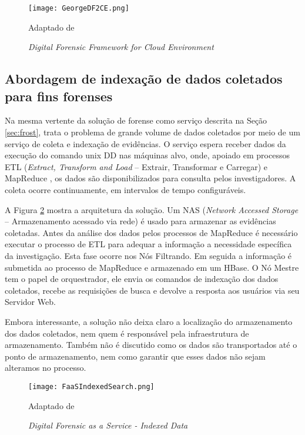 \begin{figure}[htb!]
\footnotesize
\caption{\textit{Digital Forensic Framework for Cloud Environment}}
\texttt{[image: GeorgeDF2CE.png]}
\centering
\label{fig:GeorgeDF2CE}
\begin{center}
Adaptado de \cite{GeorgeDF2CE:2012} 
\end{center}
\end{figure}


\subsection{Abordagem de indexação de dados coletados para fins forenses}
\label{sec:indexacaoforense}

Na mesma vertente da solução de forense como serviço descrita na Seção \ref{sec:frost}, \cite{FaaSIndexedSearch:2012} trata o problema de grande volume de dados coletados por meio de um serviço de coleta e indexação de evidências.
%
O serviço espera receber dados da execução do comando unix DD \cite{UnixManPagesDD} nas máquinas alvo, onde, apoiado em processos ETL (\textit{Extract, Transform and Load} -- Extrair, Transformar e Carregar) e MapReduce \cite{WikipediaMapReduce}, os dados são disponibilizados para consulta pelos investigadores.
%
A coleta ocorre continuamente, em intervalos de tempo configuráveis.


A Figura \ref{fig:FaaSIndexedSearch} mostra a arquitetura da solução. Um NAS (\textit{Network Accessed Storage} -- Armazenamento acessado via rede) é usado para armazenar as evidências coletadas.
%
Antes da análise dos dados pelos processos de MapReduce é necessário executar o processo de ETL para adequar a informação a necessidade específica da investigação. Esta fase ocorre nos Nós Filtrando.
%
Em seguida a informação é submetida ao processo de MapReduce e armazenado em um HBase.
%
O Nó Mestre tem o papel de orquestrador, ele envia os comandos de indexação dos dados coletados, recebe as requisições de busca e devolve a resposta aos usuários via seu Servidor Web.


Embora interessante, a solução não deixa claro a localização do armazenamento dos dados coletados, nem quem é responsável pela infraestrutura de armazenamento.
%
Também não é discutido como os dados são transportados até o ponto de armazenamento, nem como garantir que esses dados não sejam alteramos no processo.
%


\begin{figure}[htb!]
\footnotesize
\caption{\textit{Digital Forensic as a Service - Indexed Data}}
\texttt{[image: FaaSIndexedSearch.png]}
\centering
\label{fig:FaaSIndexedSearch}
\begin{center}
Adaptado de \cite{FaaSIndexedSearch:2012} 
\end{center}
\end{figure}


